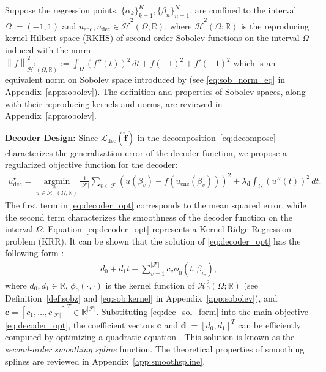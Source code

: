 \documentclass{article}
\def\encs{u_\textrm{enc}}
\def\decs{u_\textrm{dec}}
\def\declamb{\lambda_\textrm{d}}
\def\ldec{\mathcal{L}_\textrm{dec}}
\def\stset{\mathcal{F}}
\def\fhat{\mathbf{\hat{f}}}
\newcommand{\norm}[1]{\left\lVert#1\right\rVert}
\newcommand{\hilz}[1]{\mathcal{H}_0^{#1}\left(\Omega;\mathbb{R}\right)}
\newcommand{\hiltilde}[1]{\widetilde{\mathcal{H}}^{#1}\left(\Omega;\mathbb{R}\right)}
\begin{document}
Suppose the regression points, $\{\alpha_k\}^K_{k=1}, \{\beta_n\}^N_{n=1}$, are confined to the interval $\Omega:=(-1, 1)$ and $\encs, \decs \in \hiltilde{2}$, where $\hiltilde{2}$ is the reproducing kernel Hilbert space (RKHS) of second-order Sobolev functions on the interval $\Omega$ induced with the norm $\norm{f}_{\hiltilde{2}}^2 := \int_{\Omega} (f''(t))^2\,dt +  f(-1)^2 + f'(-1)^2$ which is an equivalent norm on Sobolev space introduced by \citep{kimeldorf1971some} (see \eqref{eq:sob_norm_eq} in Appendix~\ref{app:sobolev}). The definition and properties of Sobolev spaces, along with their reproducing kernels and norms, are reviewed in Appendix~\ref{app:sobolev}.

{\bf Decoder Design:} Since $\ldec(\fhat)$  in the decomposition~\eqref{eq:decompose} characterizes the generalization error of the decoder function, we propose a regularized objective function for the decoder:
\begin{align}\label{eq:decoder_opt}
    \decs^\star=\underset{u \in \hiltilde{2}}{\operatorname{argmin}} \frac{1}{|\stset|} \sum_{v \in \stset}\left(u\left(\beta_v\right)-f\left(\encs\left(\beta_v\right)\right)\right)^2+\declamb \int_{\Omega} \left(u''(t)\right)^2\,dt.
\end{align}
The first term in \eqref{eq:decoder_opt} corresponds to the mean squared error, while the second term characterizes the smoothness of the decoder function on the interval $\Omega$. Equation~\eqref {eq:decoder_opt} represents a Kernel Ridge Regression problem (KRR). It can be shown that the solution of \eqref{eq:decoder_opt} has the following form \citep{duchon1977splines, wahba1990spline}:
\begin{align}\label{eq:dec_sol_form}
     d_0 + d_1t + \sum^{|\stset|}_{v=1} c_v\phi_0(t,\beta_{i_v}),
\end{align}
where $d_0, d_1 \in \mathbb{R}$, $\phi_0(\cdot, \cdot)$ is the kernel function of $\hilz{2}$ (see Definition~\ref{def:sobz} and \eqref{eq:sob:kernel} in Appendix~\ref{app:sobolev}), and $\mathbf{c}=[c_1,\dots,c_{|\stset|}]^T \in \mathbb{R}^{|\stset|}$. Substituting \eqref{eq:dec_sol_form} into the main objective \eqref{eq:decoder_opt}, the coefficient vectors $\mathbf{c}$ and $\mathbf{d}:=[d_0, d_1]^T$ can be efficiently computed by optimizing a quadratic equation \citep{wahba1975smoothing}. This solution is known as the \emph{second-order smoothing spline} function. The theoretical properties of smoothing splines are reviewed in Appendix~\ref{app:smoothspline}.
\end{document}
